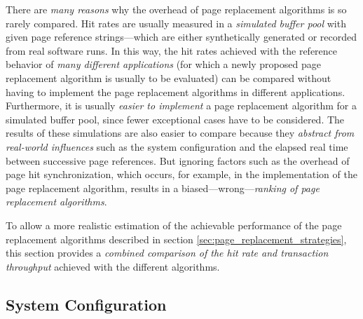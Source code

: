     There are \emph{many reasons} why the overhead of page replacement algorithms is so rarely compared. Hit rates are usually measured in a \emph{simulated buffer pool} with given page reference strings---which are either synthetically generated or recorded from real software runs. In this way, the hit rates achieved with the reference behavior of \emph{many different applications} (for which a newly proposed page replacement algorithm is usually to be evaluated) can be compared without having to implement the page replacement algorithms in different applications. Furthermore, it is usually \emph{easier to implement} a page replacement algorithm for a simulated buffer pool, since fewer exceptional cases have to be considered. The results of these simulations are also easier to compare because they \emph{abstract from real-world influences} such as the system configuration and the elapsed real time between successive page references. But ignoring factors such as the overhead of page hit synchronization, which occurs, for example, in the  implementation of the  page replacement algorithm, results in a biased---wrong---\emph{ranking of page replacement algorithms}.

    To allow a more realistic estimation of the achievable performance of the page replacement algorithms described in section \ref{sec:page_replacement_strategies}, this section provides a \emph{combined comparison of the hit rate and transaction throughput} achieved with the different algorithms.

\subsection{System Configuration} \label{subsec:page_evictioners_system_configuration}

